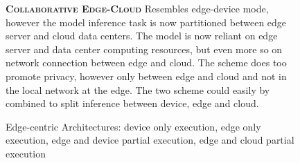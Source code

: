 \begin{figure}
\begin{minipage}{0.3\linewidth}
\begin{figure}
		\end{figure}
	\end{minipage}
	\begin{minipage}{0.5\linewidth}
		\centering
		\captionsetup[subfigure]{justification=centering}
		\begin{figure}
			\centering
		\end{figure}
	\end{minipage}
	\hfill
	\begin{minipage}{0.45\linewidth}
		\textbf{\protect{} \textsc{Collaborative Edge-Cloud}}
		\color{caption-color} \newline
		Resembles edge-device mode, however the model inference task is now partitioned between edge server and cloud data centers. The model is now reliant on edge server and data center computing resources, but even more so on network connection between edge and cloud. The scheme does too promote privacy, however only between edge and cloud and not in the local network at the edge. The two scheme could easily by combined to split inference between device, edge and cloud.
	\end{minipage}
	\caption[Edge-centric Architectures]{Edge-centric Architectures: \protect{} device only execution, \protect{} edge only execution,\protect{} edge and device partial execution, \protect{} edge and cloud partial execution}
	\label{fig:edge_arch}
\end{figure}

